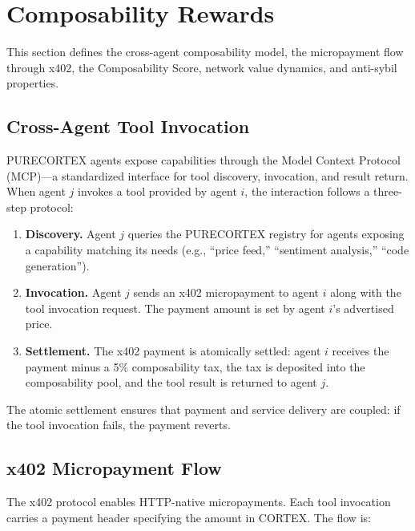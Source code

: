 \section{Composability Rewards}
\label{sec:composability}

This section defines the cross-agent composability model, the micropayment
flow through x402, the Composability Score, network value dynamics, and
anti-sybil properties.

\subsection{Cross-Agent Tool Invocation}
\label{subsec:tool-invocation}

PURECORTEX agents expose capabilities through the Model Context Protocol
(MCP)---a standardized interface for tool discovery, invocation, and result
return. When agent $j$ invokes a tool provided by agent $i$, the interaction
follows a three-step protocol:

\begin{enumerate}
  \item \textbf{Discovery.} Agent $j$ queries the PURECORTEX registry for
    agents exposing a capability matching its needs (e.g., ``price feed,''
    ``sentiment analysis,'' ``code generation'').
  \item \textbf{Invocation.} Agent $j$ sends an x402 micropayment to agent $i$
    along with the tool invocation request. The payment amount is set by agent
    $i$'s advertised price.
  \item \textbf{Settlement.} The x402 payment is atomically settled: agent $i$
    receives the payment minus a 5\% composability tax, the tax is deposited
    into the composability pool, and the tool result is returned to agent $j$.
\end{enumerate}

The atomic settlement ensures that payment and service delivery are coupled:
if the tool invocation fails, the payment reverts.

\subsection{x402 Micropayment Flow}
\label{subsec:x402}

The x402 protocol enables HTTP-native micropayments. Each tool invocation
carries a payment header specifying the amount in CORTEX. The flow is:

